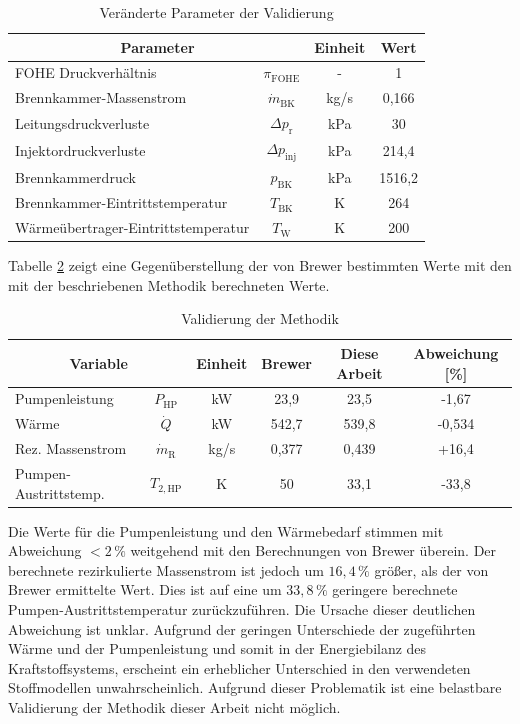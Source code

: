\begin{table}[ht]
    \centering
	\caption{Veränderte Parameter der Validierung}
	\begin{tabular} {|l|c|c|c|} \hline%
    \multicolumn{2}{|c|}{Parameter} & Einheit & Wert\\ \hline\hline%
    FOHE Druckverhältnis & $\pi_\mathrm{FOHE}$ & - & 1 \\ \hline
    Brennkammer-Massenstrom & $\dot{m}_\mathrm{BK}$ & kg/s & 0,166 \\ \hline
    Leitungsdruckverluste & $\Delta p_\mathrm{r}$ & kPa & 30 \\ \hline
    Injektordruckverluste & $\Delta p_\mathrm{inj}$ & kPa & 214,4 \\ \hline
    Brennkammerdruck & $p_\mathrm{BK}$ & kPa & 1516,2 \\ \hline
    Brennkammer-Eintrittstemperatur & $T_\mathrm{BK}$ & K & 264 \\ \hline
    Wärmeübertrager-Eintrittstemperatur & $T_\mathrm{W}$ & K & 200 \\ \hline
    \end{tabular}	
    \label{Tab:brewer}%
\end{table}
\FloatBarrier 

Tabelle \ref{Tab:validation} zeigt eine Gegenüberstellung der von Brewer bestimmten Werte mit den mit der beschriebenen Methodik berechneten Werte. 

\begin{table}[ht]
    \centering
	\caption{Validierung der Methodik}
	\begin{tabular} {|l|c|c|c|c|c|} \hline%
    \multicolumn{2}{|c|}{Variable} & Einheit & Brewer \cite{Brewer.1991} & Diese Arbeit & Abweichung [\%] \\ \hline\hline%
    Pumpenleistung & $P_\mathrm{HP}$ & kW & 23,9 & 23,5 & -1,67 \\ \hline
    Wärme & $\dot{Q}$ & kW & 542,7 & 539,8 & -0,534 \\ \hline
    Rez. Massenstrom & $\dot{m}_\mathrm{R}$ & kg/s & 0,377 & 0,439 & +16,4 \\ \hline
    Pumpen-Austrittstemp. & $T_{2,\mathrm{HP}}$ & K & 50 & 33,1 & -33,8 \\ \hline
    \end{tabular}	
    \label{Tab:validation}%
\end{table}
\FloatBarrier 

Die Werte für die Pumpenleistung und den Wärmebedarf stimmen mit Abweichung $<2\,\%$ weitgehend mit den Berechnungen von Brewer überein. Der berechnete rezirkulierte Massenstrom ist jedoch um $16,4\,\%$ größer, als der von  Brewer ermittelte Wert. Dies ist auf eine um $33,8\,\%$ geringere berechnete Pumpen-Austrittstemperatur zurückzuführen. Die Ursache dieser deutlichen Abweichung ist unklar. Aufgrund der geringen Unterschiede der zugeführten Wärme und der Pumpenleistung und somit in der Energiebilanz des Kraftstoffsystems, erscheint ein erheblicher Unterschied in den verwendeten Stoffmodellen unwahrscheinlich. Aufgrund dieser Problematik ist eine belastbare Validierung der Methodik dieser Arbeit nicht möglich.

